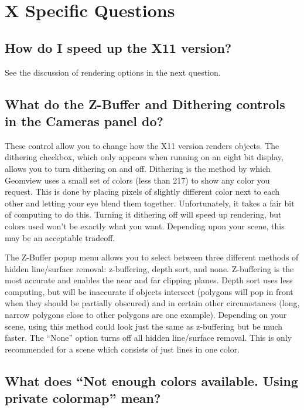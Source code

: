 \documentclass[12pt,a4paper]{article}
\begin{document}
\section{X Specific Questions}

    \subsection{How do I speed up the X11 version?}

        See the discussion of rendering options in the next question.

    \subsection{What do the Z-Buffer and Dithering controls in the Cameras panel do?}

        These control allow you to change how the X11 version renders objects.
        The dithering checkbox, which only appears when running on an eight bit
        display, allows you to turn dithering on and off. Dithering is the
        method by which Geomview uses a small set of colors (less than 217) to
        show any color you request. This is done by placing pixels of slightly
        different color next to each other and letting your eye blend them
        together. Unfortunately, it takes a fair bit of computing to do this.
        Turning it dithering off will speed up rendering, but colors used won't
        be exactly what you want. Depending upon your scene, this may be an
        acceptable tradeoff.

        The Z-Buffer popup menu allows you to select between three different
        methods of hidden line/surface removal: z-buffering, depth sort, and
        none. Z-buffering is the most accurate and enables the near and far
        clipping planes. Depth sort uses less computing, but will be inaccurate
        if objects intersect (polygons will pop in front when they should be
        partially obscured) and in certain other circumstances (long, narrow
        polygons close to other polygons are one example). Depending on your
        scene, using this method could look just the same as z-buffering but be
        much faster. The ``None'' option turns off all hidden line/surface
        removal. This is only recommended for a scene which consists of just
        lines in one color.

    \subsection{What does ``Not enough colors available. Using private colormap'' mean?}
\end{document}
